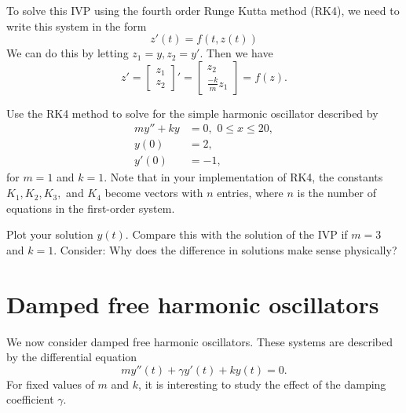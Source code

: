 To solve this IVP using the fourth order Runge Kutta method (RK4), we need to write this system in the form 
\[z'(t) = f(t,z(t)) \]
We can do this by letting $z_1 = y, z_2 = y'$. Then we have \[     z'= 
 \left[\begin{array}{c}z_1 \\z_2\end{array}\right]'  =  \left[\begin{array}{c}z_2 \\\frac{-k}{m}z_1\end{array}\right]= f(z).\]


\begin{problem} Use the RK4 method to solve for the simple harmonic oscillator 
described by 
\begin{align*}
my'' + ky &= 0,\,\, 0 \leq x \leq 20, \\
y(0) &= 2, \\
y'(0) &= -1,
\end{align*} 
for $m = 1$ and $k =1$. Note that in your implementation of RK4, the constants $K_1, K_2, K_3,$ and $K_4$ become vectors with $n$ entries, where $n$ is the number of equations in the first-order system. 

Plot your solution $y(t)$.  Compare this with the solution of the IVP if  $m = 3$ and $k =1$. Consider: Why does the difference in solutions make sense physically?
\end{problem}


\section*{Damped free harmonic oscillators} We now consider damped free harmonic oscillators. These systems are described by the differential equation
\[my''(t) +\gamma y'(t) + ky(t) = 0.\]
For fixed values of $m$ and $k$, it is interesting to study the effect of the damping coefficient $\gamma$. 

